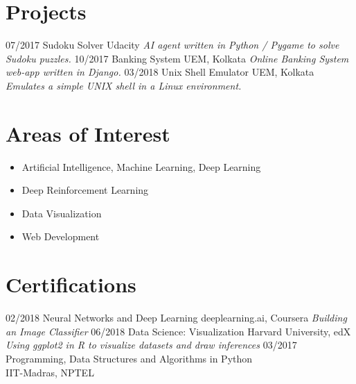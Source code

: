 \documentclass[]{friggeri-cv}
\begin{document}
\section{Projects}
\begin{entrylist}
  \entry
    {07/2017}
    {Sudoku Solver}
    {Udacity}
    {\emph{AI agent written in Python / Pygame to solve Sudoku puzzles.}}
  \entry
    {10/2017}
    {Banking System}
    {UEM, Kolkata}
    {\emph{Online Banking System web-app written in Django.}}
  \entry
    {03/2018}
    {Unix Shell Emulator}
    {UEM, Kolkata}
    {\emph{Emulates a simple UNIX shell in a Linux environment.}}
    
\end{entrylist}

\section{Areas of Interest}
\begin{itemize}
    \item Artificial Intelligence, Machine Learning, Deep Learning
    \item Deep Reinforcement Learning
    \item Data Visualization
    \item Web Development
\end{itemize}

\section{Certifications}
\begin{entrylist}
  \entry
    {02/2018}
    {Neural Networks and Deep Learning}
    {deeplearning.ai, Coursera}
    {\emph{Building an Image Classifier}}
  \entry
    {06/2018}
    {Data Science: Visualization}
    {Harvard University, edX}
    {\emph{Using ggplot2 in R to visualize datasets and draw inferences}}
  \entry
    {03/2017}
    {Programming, Data Structures and Algorithms in Python\\}
    {IIT-Madras, NPTEL}
    
\end{entrylist}
\end{document}
